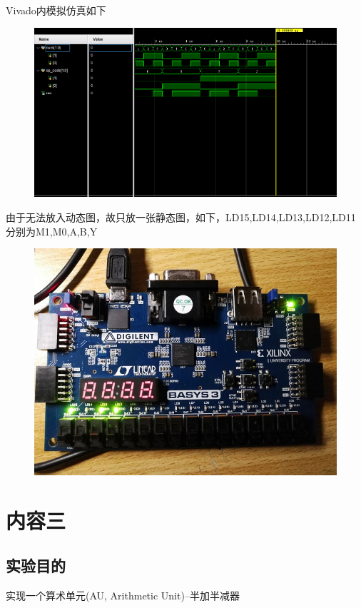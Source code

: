 \documentclass[11pt,UTF8]{ctexart}
\begin{document}
\par Vivado内模拟仿真如下
\begin{figure}[H]
    \centering
    \includegraphics[width=0.6\linewidth]{fig/vivado_wave.PNG}
\end{figure}
\par 由于无法放入动态图，故只放一张静态图，如下，LD15,LD14,LD13,LD12,LD11分别为M1,M0,A,B,Y
\begin{figure}[H]
    \centering
    \includegraphics[width=0.6\linewidth]{fig/board.jpg}
\end{figure}


\section{内容三}
\subsection{实验目的}
实现一个算术单元(AU, Arithmetic Unit)--半加半减器
\end{document}
